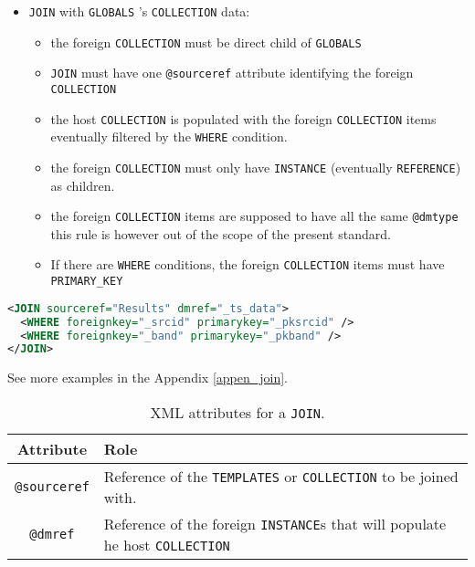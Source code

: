\begin{itemize}
   \item \texttt{JOIN}  with \texttt{GLOBALS} 's \texttt{COLLECTION} data:
       \begin{itemize}
         \item the foreign \texttt{COLLECTION} must be direct child of \texttt{GLOBALS} 
         \item \texttt{JOIN} must have one \texttt{@sourceref} attribute identifying the foreign \texttt{COLLECTION} 
         \item the host \texttt{COLLECTION} is populated with the foreign \texttt{COLLECTION} items eventually filtered by the \texttt{WHERE} condition.
         \item the foreign \texttt{COLLECTION} must only have \texttt{INSTANCE}  (eventually \texttt{REFERENCE}) as children.
         \item the foreign \texttt{COLLECTION} items are supposed to have all the same \texttt{@dmtype}  this rule is however out of the scope of the present standard.
         \item If there are \texttt{WHERE} conditions, the foreign \texttt{COLLECTION} items must have \texttt{PRIMARY\_KEY} 
  \end{itemize}
\end{itemize}

\begin{lstlisting}[label={lst:join},caption={\texttt{JOIN example with 2 join conditions.} },language=XML]
<JOIN sourceref="Results" dmref="_ts_data">
  <WHERE foreignkey="_srcid" primarykey="_pksrcid" />
  <WHERE foreignkey="_band" primarykey="_pkband" />
</JOIN>
\end{lstlisting}

See more examples in the Appendix \ref{appen_join}. 
\begin{table}[!htbp]
\small
\centering
\begin{tabulary}{\linewidth}{|c|J|}       
       \hline 
            \textbf{Attribute} & 
            \textbf {Role}\\
       \hline         \hline  
             \texttt{@sourceref} & 
            Reference of the \texttt{TEMPLATES} or \texttt{COLLECTION} to be joined with. \\
        \hline 
            \texttt{@dmref} & 
            Reference of the foreign \texttt{INSTANCE}s that will populate he host \texttt{COLLECTION}  \\
        \hline 
     \end{tabulary}
     \caption{XML attributes for a \texttt{JOIN}.} 
     \label{tbl:join-att}
 \end{table}

